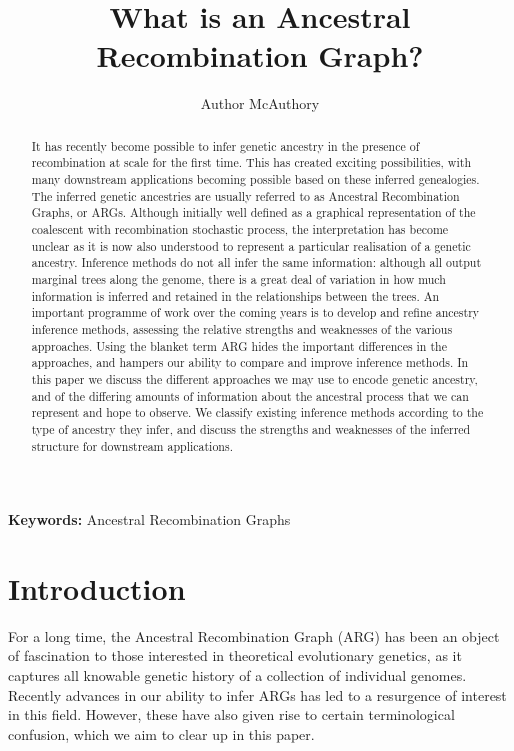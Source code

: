 \documentclass{article}
\begin{document}
\linenumbers
\title{What is an Ancestral Recombination Graph?}
\author{Author McAuthory}

\maketitle

\begin{abstract}
It has recently become possible to infer genetic ancestry in the presence of
recombination at scale for the first time. This has created exciting
possibilities, with many downstream applications becoming possible based on
these inferred genealogies. The inferred genetic ancestries are usually
referred to as Ancestral Recombination Graphs, or ARGs. Although initially well
defined as a graphical representation of the coalescent with recombination
stochastic process, the interpretation has become unclear as it is now
also understood to represent a particular realisation of a genetic
ancestry.
Inference methods do not all infer the same information:
although all output marginal trees along the genome, there is a great deal of
variation in how much information is inferred and retained in the relationships
between the trees. An important programme of work over the coming years is to
develop and refine ancestry inference methods, assessing the relative strengths
and weaknesses of the various approaches. Using the blanket term ARG hides the
important differences in the approaches, and hampers our ability to compare and
improve inference methods. In this paper we discuss the different approaches we
may use to encode genetic ancestry, and of the differing amounts of information
about the ancestral process that we can represent and hope to observe. We
classify existing inference methods according to the type of ancestry they
infer, and discuss the strengths and weaknesses of the inferred structure for
downstream applications.
\end{abstract}

\textbf{Keywords:} Ancestral Recombination Graphs

\section*{Introduction}

For a long time, the Ancestral Recombination Graph (ARG) has been an object of fascination
to those interested in theoretical evolutionary genetics, as it captures all knowable genetic
history of a collection of individual genomes. Recently advances in our ability to infer ARGs
has led to a resurgence of interest in this field. However, these have also given rise to certain 
terminological confusion, which we aim to clear up in this paper.
\end{document}
